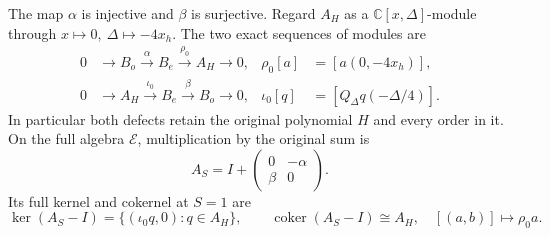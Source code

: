 \begin{theorem}
The map \(\alpha\) is injective and \(\beta\) is surjective.
Regard \(A_H\) as a \(\mathbb C[x,\Delta]\)-module through
\(x\mapsto0,\ \Delta\mapsto-4x_h\).  The two exact sequences
of modules are
\[
 \begin{aligned}
 0&\longrightarrow B_o\xrightarrow{\alpha}B_e
      \xrightarrow{\rho_0}A_H\longrightarrow0,
 &\rho_0[a]&=[a(0,-4x_h)],\\
 0&\longrightarrow A_H\xrightarrow{\iota_0}B_e
      \xrightarrow{\beta}B_o\longrightarrow0,
 &\iota_0[q]&=[Q_\Delta q(-\Delta/4)].
 \end{aligned}                                                    \tag{SSP.11}
\]
In particular both defects retain the original polynomial \(H\)
and every order in it.  On the full algebra \(\mathcal E\),
multiplication by the original sum is
\[
 A_S=I+\begin{pmatrix}0&-\alpha\\\beta&0\end{pmatrix}.
 \tag{SSP.12}
\]
Its full kernel and cokernel at \(S=1\) are
\[
 \ker(A_S-I)=\{(\iota_0q,0):q\in A_H\},\qquad
 \operatorname{coker}(A_S-I)\cong A_H,\quad
 [(a,b)]\mapsto\rho_0a .
 \tag{SSP.13}
\]
\end{theorem}
